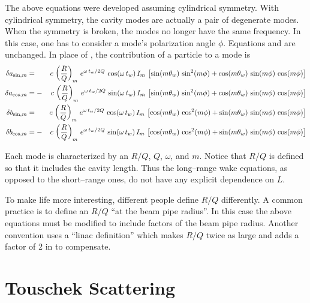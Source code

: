 The above equations were developed assuming cylindrical symmetry. With
cylindrical symmetry, the cavity modes are actually a pair of
degenerate modes. When the symmetry is broken, the modes no longer have the
same frequency. In this case, one has to consider a mode's polarization
angle $\phi$. Equations  and  are unchanged. 
In place of , the contribution of a particle to a mode is
\begin{alignat}{2}
  \delta a_{\sin, m} &=  &c \, \left( \frac{R}{Q} \right)_m \,
    e^{\omega \, t_w/ 2 Q} \, \cos (\omega \, t_w) \, I_m \, \left[
    \sin(m \theta_w) \, \sin^2(m \phi) + 
    \cos(m \theta_w) \, \sin(m \phi) \, \cos(m\phi) \right]
    \nonumber \\
  \delta a_{\cos, m} &= -&c \, \left( \frac{R}{Q} \right)_m \,
    e^{\omega \, t_w/ 2 Q} \, \sin (\omega \, t_w) \, I_m \, \left[ 
    \sin(m \theta_w) \, \sin^2(m \phi) + 
    \cos(m \theta_w) \, \sin(m \phi) \, \cos(m\phi) \right]
    \\
  \delta b_{\sin, m} &=  &c \, \left( \frac{R}{Q} \right)_m \,
    e^{\omega \, t_w/ 2 Q} \, \cos (\omega \, t_w) \, I_m \, \left[
    \cos(m \theta_w) \, \cos^2(m \phi) + 
    \sin(m \theta_w) \, \sin(m \phi) \, \cos(m\phi) \right]
    \nonumber \\
  \delta b_{\cos, m} &= -&c \, \left( \frac{R}{Q} \right)_m \,
    e^{\omega \, t_w/ 2 Q} \, \sin (\omega \, t_w) \, I_m \, \left[
    \cos(m \theta_w) \, \cos^2(m \phi) + 
    \sin(m \theta_w) \, \sin(m \phi) \, \cos(m\phi) \right]
    \nonumber
\end{alignat}

Each mode is characterized by an $R/Q$, $Q$, $\omega$, and $m$. Notice
that $R/Q$ is defined so that it includes the cavity length. Thus the
long--range wake equations, as opposed to the short--range ones, do
not have any explicit dependence on $L$. 

To make life more interesting, different people define $R/Q$
differently. A common practice is to define an $R/Q$ ``at the beam
pipe radius''. In this case the above equations must be modified to
include factors of the beam pipe radius. Another convention uses a
``linac definition'' which makes $R/Q$ twice as large and adds a
factor of 2 in  to compensate.

\section{Touschek Scattering}
\label{s:touschek}

